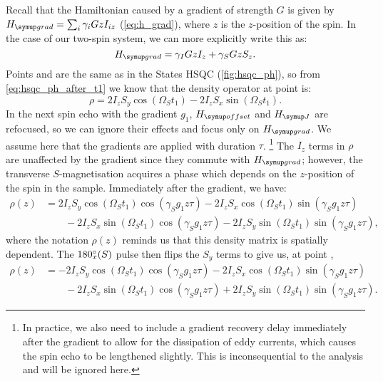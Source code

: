 Recall that the Hamiltonian caused by a gradient of strength $G$ is given by $\Hgrad = \sum_i \gamma_i Gz I_{iz}$ (\cref{eq:h_grad}), where $z$ is the $z$-position of the spin.
In the case of our two-spin system, we can more explicitly write this as:
\begin{equation}
    \label{eq:h_grad_is_system}
    \Hgrad = \gamma_I Gz I_z + \gamma_S Gz S_z.
\end{equation}
Points  and  are the same as in the States HSQC (\cref{fig:hsqc_ph}), so from \cref{eq:hsqc_ph_after_t1} we know that the density operator at point  is:
\begin{equation}
    \label{eq:hsqc_ea_prodop_2}
    \rho = 2I_zS_y\cos(\Omega_S t_1) - 2I_zS_x \sin(\Omega_S t_1).
\end{equation}
In the next spin echo with the gradient $g_1$, $\Hoffset$ and $\HJ$ are refocused, so we can ignore their effects and focus only on $\Hgrad$.
We assume here that the gradients are applied with duration $\tau$.%
\footnote{In practice, we also need to include a gradient recovery delay immediately after the gradient to allow for the dissipation of eddy currents, which causes the spin echo to be lengthened slightly. This is inconsequential to the analysis and will be ignored here.}
The $I_z$ terms in $\rho$ are unaffected by the gradient since they commute with $\Hgrad$; however, the transverse $S$-magnetisation acquires a phase which depends on the $z$-position of the spin in the sample.
Immediately after the gradient, we have:
\begin{equation}
    \label{eq:hsqc_ea_gradient}
    \begin{aligned}
        \rho(z) &= 2I_zS_y\cos(\Omega_S t_1)\cos(\gamma_S g_1 z \tau) - 2I_zS_x\cos(\Omega_S t_1)\sin(\gamma_S g_1 z \tau) \\
                &\quad\quad {} - 2I_zS_x \sin(\Omega_S t_1)\cos(\gamma_S g_1 z \tau) - 2I_zS_y\sin(\Omega_S t_1)\sin(\gamma_S g_1 z \tau),
    \end{aligned}
\end{equation}
where the notation $\rho(z)$ reminds us that this density matrix is spatially dependent.
The $\angang{180}{x}(S)$ pulse then flips the $S_y$ terms to give us, at point ,
\begin{equation}
    \label{eq:hsqc_ea_after_grad_echo}
    \begin{aligned}
        \rho(z) &= -2I_zS_y\cos(\Omega_S t_1)\cos(\gamma_S g_1 z \tau) - 2I_zS_x\cos(\Omega_S t_1)\sin(\gamma_S g_1 z \tau) \\
                &\quad\quad {} - 2I_zS_x \sin(\Omega_S t_1)\cos(\gamma_S g_1 z \tau) + 2I_zS_y\sin(\Omega_S t_1)\sin(\gamma_S g_1 z \tau).
    \end{aligned}
\end{equation}
